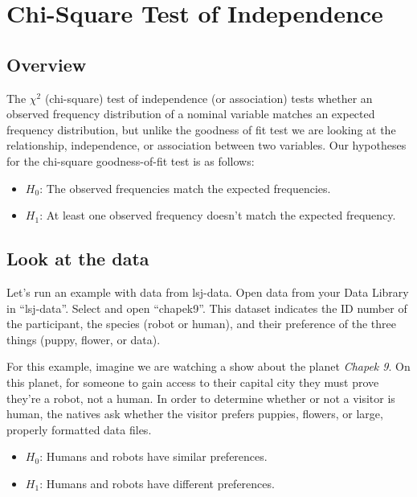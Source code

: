 \documentclass[
]{book}
\begin{document}
\hypertarget{chi-square-test-of-independence}{%
\section{Chi-Square Test of Independence}\label{chi-square-test-of-independence}}

\hypertarget{overview-4}{%
\subsection{Overview}\label{overview-4}}

The \(\chi^2\) (chi-square) test of independence (or association) tests whether an observed frequency distribution of a nominal variable matches an expected frequency distribution, but unlike the goodness of fit test we are looking at the relationship, independence, or association between two variables. Our hypotheses for the chi-square goodness-of-fit test is as follows:

\begin{itemize}
\item
  \(H_0\): The observed frequencies match the expected frequencies.
\item
  \(H_1\): At least one observed frequency doesn't match the expected frequency.
\end{itemize}

\hypertarget{look-at-the-data-4}{%
\subsection{Look at the data}\label{look-at-the-data-4}}

Let's run an example with data from lsj-data. Open data from your Data Library in ``lsj-data''. Select and open ``chapek9''. This dataset indicates the ID number of the participant, the species (robot or human), and their preference of the three things (puppy, flower, or data).

For this example, imagine we are watching a show about the planet \emph{Chapek 9}. On this planet, for someone to gain access to their capital city they must prove they're a robot, not a human. In order to determine whether or not a visitor is human, the natives ask whether the visitor prefers puppies, flowers, or large, properly formatted data files.

\begin{itemize}
\item
  \(H_0\): Humans and robots have similar preferences.
\item
  \(H_1\): Humans and robots have different preferences.
\end{itemize}
\end{document}
